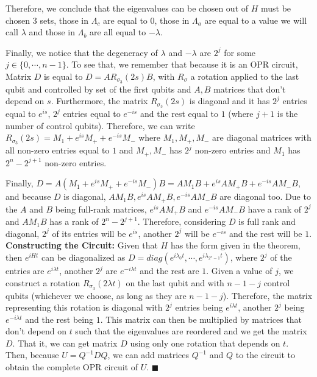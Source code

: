Therefore, we conclude that the eigenvalues can be chosen out of $H$ must be chosen 3 sets, 
those in $\Lambda_c$ are equal to $0$, those in $\Lambda_a$ are equal to a value we
will call $\lambda$ and those in $\Lambda_b$ are all equal to $-\lambda$. 

Finally, we notice that the degeneracy of $\lambda$ and
$-\lambda$ are $2^j$ for some $j \in \{0, \cdots, n-1\}$.
 To see that, we remember that because it is an OPR circuit, 
Matrix $D$ is equal to $D = A R_{\sigma_3} (2s)B$, 
with $R_{\sigma}$ a rotation applied to the last qubit and controlled by set of the first qubits and $A,B$ 
matrices that don't depend on $s$.
Furthermore, the matrix $R_{\sigma_3}(2s)$ is diagonal and
it has $2^j$ entries equal to $e^{is}$, $2^j$ entries equal to $e^{-is}$ and the rest equal to $1$ 
(where $j+1$ is the number of  control qubits). 
Therefore, we can write $R_{\sigma_3}(2s) = M_1 + e^{is} M_+ + e^{-is} M_-$
 where $M_1, M_+, M_-$ are diagonal matrices with all non-zero entries equal to $1$ and 
$M_+, M_-$ has $2^j$ non-zero entries and $M_1$ has $2^n - 2^{j+1}$ non-zero entries.

Finally, $D = A(M_1 + e^{is} M_+ + e^{-is} M_-) B = AM_1 B + e^{is} AM_+ B + e^{-is} AM_- B$,
and because $D$ is diagonal, $AM_1B , e^{is} AM_+B, e^{-is} AM_- B$ are
diagonal too. Due to the $A$ and $B$ being full-rank matrices, $e^{is} AM_+B$ 
and $e^{-is} AM_-B$ have a rank of $2^j$ and $AM_1B$ has a rank of $2^n- 2^{j+1}$. 
Therefore, considering $D$ is full rank and diagonal, 
$2^j$ of its entries will be $e^{is}$, another $2^j$ will be $e^{-is}$
and the rest will be $1$. \\

\textbf{Constructing the 
Circuit:}  Given that $H$ has the form given in the theorem,
then $e^{iHt}$ can be diagonalized as $D = diag(e^{i\lambda_0 t}, \cdots , e^{i\lambda_{2^n-1}t})$,
where $2^j$ of the entries are $e^{i\lambda t}$, another $2^j$ are $e^{-i\lambda t}$ 
and the rest are $1$. 
Given a value of $j$, we construct a rotation $R_{\sigma_3}(2\lambda t)$ on the last qubit and with $n-1-j$ control qubits 
(whichever we choose, as long as they are $n-1-j$).
Therefore, the matrix representing this rotation is diagonal with $2^j$
entries being $e^{i\lambda t}$, another $2^j$ being $e^{-i\lambda t}$ and the rest being $1$.
This matrix can then be multiplied by matrices that don't depend on $t$
such that the eigenvalues are reordered and we get the matrix $D$.
That it, we can get matrix $D$ using only one rotation that depends on $t$. 
Then, because $U = Q^{-1} D Q$, we can add matrices $Q^{-1}$ and $Q$ to the circuit
to obtain the complete OPR circuit of $U$. $\blacksquare$ \\ \\

